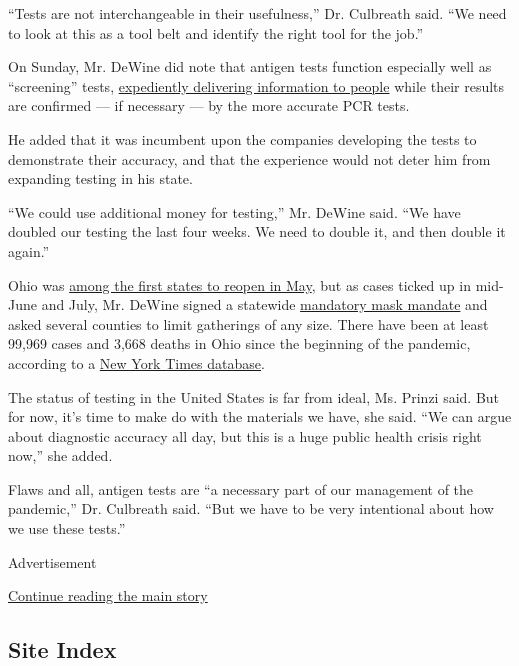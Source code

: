 ``Tests are not interchangeable in their usefulness,'' Dr. Culbreath
said. ``We need to look at this as a tool belt and identify the right
tool for the job.''

On Sunday, Mr. DeWine did note that antigen tests function especially
well as ``screening'' tests,
\href{https://www.nytimes3xbfgragh.onion/2020/08/06/health/rapid-Covid-tests.html}{expediently
delivering information to people} while their results are confirmed ---
if necessary --- by the more accurate PCR tests.

He added that it was incumbent upon the companies developing the tests
to demonstrate their accuracy, and that the experience would not deter
him from expanding testing in his state.

``We could use additional money for testing,'' Mr. DeWine said. ``We
have doubled our testing the last four weeks. We need to double it, and
then double it again.''

Ohio was
\href{https://www.nytimes3xbfgragh.onion/interactive/2020/us/states-reopen-map-coronavirus.html}{among
the first states to reopen in May}, but as cases ticked up in mid-June
and July, Mr. DeWine signed a statewide
\href{https://www.nytimes3xbfgragh.onion/interactive/2020/us/states-reopen-map-coronavirus.html}{mandatory
mask mandate} and asked several counties to limit gatherings of any
size. There have been at least 99,969 cases and 3,668 deaths in Ohio
since the beginning of the pandemic, according to a
\href{https://www.nytimes3xbfgragh.onion/interactive/2020/us/ohio-coronavirus-cases.html}{New
York Times database}.

The status of testing in the United States is far from ideal, Ms. Prinzi
said. But for now, it's time to make do with the materials we have, she
said. ``We can argue about diagnostic accuracy all day, but this is a
huge public health crisis right now,'' she added.

Flaws and all, antigen tests are ``a necessary part of our management of
the pandemic,'' Dr. Culbreath said. ``But we have to be very intentional
about how we use these tests.''

Advertisement

\protect\hyperlink{after-bottom}{Continue reading the main story}

\hypertarget{site-index}{%
\subsection{Site Index}\label{site-index}}

